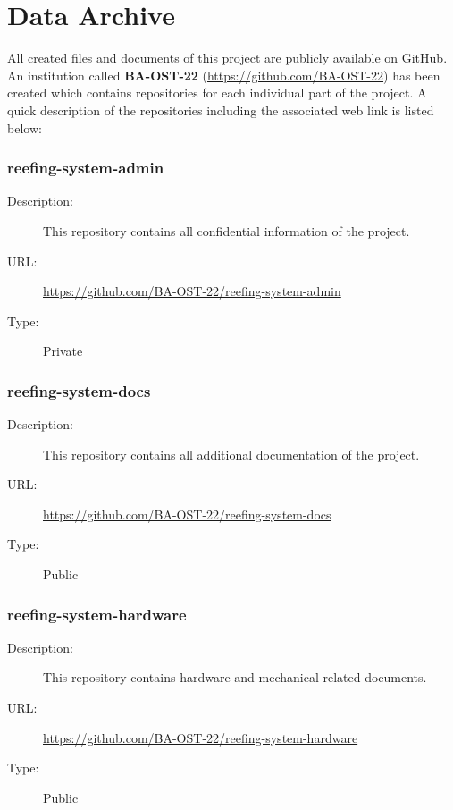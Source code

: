 \section{Data Archive} \label{Data Archive}
All created files and documents of this project are publicly available on GitHub. An institution called \textbf{BA-OST-22} (\url{https://github.com/BA-OST-22}) has been created which contains repositories for each individual part of the project.
A quick description of the repositories including the associated web link is listed below:

\subsubsection{reefing-system-admin} \label{reefing-system-admin} \vspace{-0.2cm}
\begin{description}
  \item[Description:] This repository contains all confidential information of the project.\vspace{-0.25cm}
  \item[URL:] \url{https://github.com/BA-OST-22/reefing-system-admin}\vspace{-0.25cm}
  \item[Type:] Private\vspace{-0.25cm}
\end{description}

\subsubsection{reefing-system-docs} \vspace{-0.2cm}
\begin{description}
  \item[Description:] This repository contains all additional documentation of the project.\vspace{-0.25cm}
  \item[URL:] \url{https://github.com/BA-OST-22/reefing-system-docs}\vspace{-0.25cm}
  \item[Type:] Public\vspace{-0.25cm}
\end{description}

\subsubsection{reefing-system-hardware} \vspace{-0.2cm}
\begin{description}
  \item[Description:] This repository contains hardware and mechanical related documents.\vspace{-0.25cm}
  \item[URL:] \url{https://github.com/BA-OST-22/reefing-system-hardware}\vspace{-0.25cm}
  \item[Type:] Public\vspace{-0.25cm}
\end{description}

